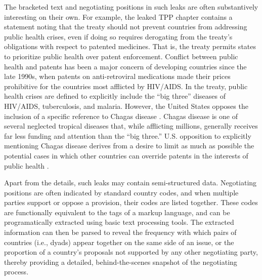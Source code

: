\documentclass[12pt]{article}
\begin{document}
The bracketed text and negotiating positions in such leaks are often substantively interesting on 
their own. For example, the leaked TPP chapter contains a statement noting that the treaty should 
not prevent countries from addressing public health crises, even if doing so requires derogating from 
the treaty's obligations with respect to patented medicines. That is, the treaty permits states to 
prioritize public health over patent enforcement. Conflict between public health and patents has been 
a major concern of developing countries since the late 1990s, when patents on anti-retroviral medications 
made their prices prohibitive for the countries most afflicted by HIV/AIDS.
In the treaty, public health crises are defined to 
explicitly include the ``big three'' diseases of HIV/AIDS, tuberculosis, and malaria. 
However, the United States opposes the inclusion of a specific reference to Chagas disease \citep[Art. QQ.A.5(a)]{wikileaks2013wikileaks}. 
Chagas disease is one of several neglected tropical diseases that, while afflicting millions, 
generally receives far less funding and attention than the ``big three.'' U.S. opposition to 
explicitly mentioning Chagas disease derives from a desire to limit as much as possible 
the potential cases in which other countries can override patents in the interests of public 
health \citep[11]{government_accountability_office2007intellectual}.

Apart from the details, such leaks may contain semi-structured data. 
Negotiating positions are often indicated by standard country codes, and when multiple parties 
support or oppose a provision, their codes are listed together. These codes are functionally 
equivalent to the tags of a markup language, and 
can be programatically extracted using basic text processing tools. 
The extracted information can then be parsed to reveal the frequency with which pairs of countries (i.e., dyads) appear together on the same side of an issue, 
or the proportion of a country's proposals not supported by any other negotiating party, thereby 
providing a detailed, behind-the-scenes snapshot of the negotiating 
process.
\end{document}
